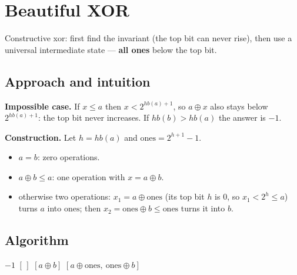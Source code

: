 \section{Beautiful XOR}
\label{sec:b-beautiful-xor}


\begin{patternbox}
Constructive xor: first find the invariant (the top bit can never rise), then
use a universal intermediate state --- \textbf{all ones} below the top bit.
\end{patternbox}

\subsection*{Approach and intuition}

\textbf{Impossible case.} If $x\le a$ then $x<2^{hb(a)+1}$, so $a\oplus x$ also
stays below $2^{hb(a)+1}$: the top bit never increases. If $hb(b)>hb(a)$ the
answer is $-1$.

\textbf{Construction.} Let $h=hb(a)$ and $\text{ones}=2^{h+1}-1$.
\begin{itemize}
  \item $a=b$: zero operations.
  \item $a\oplus b\le a$: one operation with $x=a\oplus b$.
  \item otherwise two operations: $x_1=a\oplus\text{ones}$ (its top bit $h$ is
        $0$, so $x_1<2^h\le a$) turns $a$ into $\text{ones}$; then
        $x_2=\text{ones}\oplus b\le\text{ones}$ turns it into $b$.
\end{itemize}

\subsection*{Algorithm}
\begin{algorithmic}[1]
 \Return $-1$ \EndIf
{} \Return $[\,]$ \EndIf
{} \Return $[a\oplus b]$ \EndIf
\State \Return $[a\oplus\text{ones},\ \text{ones}\oplus b]$
\end{algorithmic}


